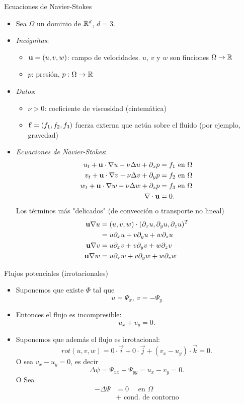 \documentclass[8pt]{beamer}
\begin{document}
\begin{frame}{Ecuaciones de Navier-Stokes}
  \begin{itemize}
  \item Sea $\Omega$ un dominio de ${\mathbb R}^d$, $d=3$.
  \item \emph{Incógnitas}:
  \begin{itemize}
      \item $\mathbf{u}=(u,v,w)$: campo de velocidades. $u$, $v$ y $w$ son finciones $\Omega \to {\mathbb R}$
      \item $p$: presión, $p:\Omega \to {\mathbb R}$
  \end{itemize}
  \item \emph{Datos}:
  \begin{itemize}
    \item $\nu>0$: coeficiente de viscosidad (cintemática)
      \item $\mathbf{f}=(f_1,f_2,f_3)$ fuerza externa que actúa sobre el fluido (por ejemplo, gravedad)
  \end{itemize}
  \item \emph{Ecuaciones de Navier-Stokes}:
  \begin{align}
    u_t + \mathbf{u}\cdot\nabla u - \nu\Delta u + \partial_x p &= f_1 \text{ en } \Omega
    \\
    v_t + \mathbf{u}\cdot\nabla v - \nu\Delta v + \partial_y p &= f_2 \text{ en } \Omega
    \\
    w_t + \mathbf{u}\cdot\nabla w - \nu\Delta w + \partial_z p &= f_3 \text{ en } \Omega
    \\
    \nabla\cdot{}\mathbf{u} &= 0.
  \end{align}
  Los términos más "delicados" (de convección o transporte no lineal)
  \begin{align}
  \mathbf{u}\nabla u &= (u,v,w) \cdot (\partial_x u, \partial_y u, \partial_z u)^T \\
  &= u \partial_x u + v \partial_y u + w \partial_z u
  \\
  \mathbf{u}\nabla v &= u \partial_x v + v \partial_y v + w \partial_z v
  \\
  \mathbf{u}\nabla w &= u \partial_x w + v \partial_y w + w \partial_z w
\end{align}
  \end{itemize}
\end{frame}
\begin{frame}{Flujos potenciales (irrotacionales)}
\begin{itemize}
  \item Suponemos que existe $\Phi$ tal que $$u=\Psi_x, \ v=-\Psi_y$$
  \item Entonces el flujo es incompresible:
  $$
  u_x + v_y =0.
  $$
  \item Suponemos que además el flujo es irrotacional:
  $$
  rot(u,v,w) = 0\cdot \vec{i} + 0\cdot \vec j + (v_x - u_y)\cdot \vec k = 0.
  $$
  O sea $v_x - u_y=0$, es decir
  $$
  \Delta \psi = \Psi_{xx} + \Psi_{yy} = u_x - v_y = 0.
  $$
  O Sea
  \begin{align}
    -\Delta \Psi &= 0 \quad \text{ en } \Omega \\
    &+ \text{ cond. de contorno}
  \end{align}
\end{itemize}

\end{frame}
\end{document}
